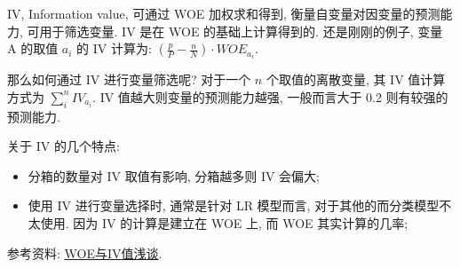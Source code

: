 IV, Information value, 可通过 WOE 加权求和得到, 衡量自变量对因变量的预测能力, 可用于筛选变量. IV 是在 WOE 的基础上计算得到的. 还是刚刚的例子, 变量 A 的取值 $a_i$ 的 IV 计算为: $(\frac{p}{P} - \frac{n}{N}) \cdot WOE_{a_i}$. 

那么如何通过 IV 进行变量筛选呢? 对于一个 $n$ 个取值的离散变量, 其 IV 值计算方式为 $\sum_i^n IV_{a_i}$. IV 值越大则变量的预测能力越强, 一般而言大于 0.2 则有较强的预测能力. 

关于 IV 的几个特点:
\begin{itemize}
	\item 分箱的数量对 IV 取值有影响, 分箱越多则 IV 会偏大;
	
	\item 使用 IV 进行变量选择时, 通常是针对 LR 模型而言, 对于其他的而分类模型不太使用. 因为 IV 的计算是建立在 WOE 上, 而 WOE 其实计算的几率;
\end{itemize}

参考资料: \href{https://zhuanlan.zhihu.com/p/74165987}{WOE与IV值浅谈}.